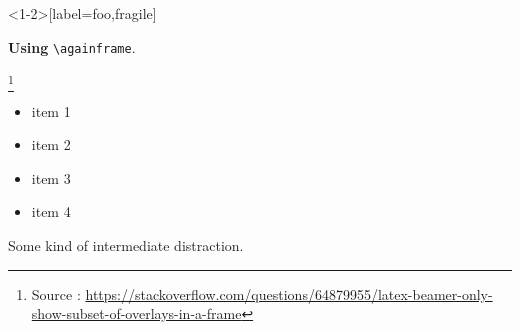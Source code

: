 \documentclass{beamer}
\begin{document}
	\begin{frame}<1-2>[label=foo,fragile]

		\textbf{Using} \verb+\againframe+.

		\footnote{Source : {\scriptsize \url{https://stackoverflow.com/questions/64879955/latex-beamer-only-show-subset-of-overlays-in-a-frame}}}

		\vfill
		\begin{itemize}
			\item<1-> item 1 %
			\item<2-> item 2 %
			\item<3-> item 3 %
			\item<4-> item 4 %
		\end{itemize}
	\end{frame}

	\begin{frame}
		Some kind of intermediate distraction.
	\end{frame}

\end{document}
